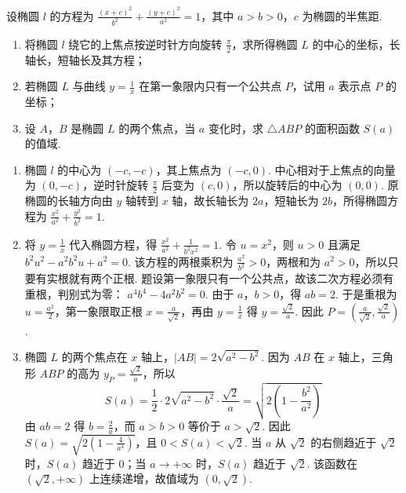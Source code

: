 \documentclass[UTF8,a4paper,oneside,11pt]{ctexbook}
\begin{document}
\begin{problem}
设椭圆 \(l\) 的方程为 \(\frac{(x+c)^{2}}{b^{2}}+\frac{(y+c)^{2}}{a^{2}}=1 \)，其中 \(a>b>0\)，\(c\) 为椭圆的半焦距.

\begin{enumerate}
\item 将椭圆 \(l\) 绕它的上焦点按逆时针方向旋转 \(\frac{\pi}{2} \)，求所得椭圆 \(L\) 的中心的坐标，长轴长，短轴长及其方程；
\item 若椭圆 \(L\) 与曲线 \(y=\frac{1}{x} \) 在第一象限内只有一个公共点 \(P\)，试用 \(a\) 表示点 \(P\) 的坐标；
\item 设 \(A\)，\(B\) 是椭圆 \(L\) 的两个焦点，当 \(a\) 变化时，求 \(\triangle ABP \) 的面积函数 \(S(a) \) 的值域.
\end{enumerate}
\end{problem}

\begin{solution}
\begin{enumerate}
\item 椭圆 \(l\) 的中心为 \((-c,-c)\)，其上焦点为 \((-c,0)\). 中心相对于上焦点的向量为 \((0,-c)\)，逆时针旋转 \(\frac\pi2\) 后变为 \((c,0)\)，所以旋转后的中心为 \((0,0)\). 原椭圆的长轴方向由 \(y\) 轴转到 \(x\) 轴，故长轴长为 \(2a\)，短轴长为 \(2b\)，所得椭圆方程为 \(\frac{x^2}{a^2}+\frac{y^2}{b^2}=1\).

\item 将 \(y=\frac{1}{x}\) 代入椭圆方程，得 \(\frac{x^2}{a^2}+\frac{1}{b^2x^2}=1\). 令 \(u=x^2\)，则 \(u>0\) 且满足
\(b^2u^2-a^2b^2u+a^2=0\). 该方程的两根乘积为 \(\frac{a^2}{b^2}>0\)，两根和为 \(a^2>0\)，所以只要有实根就有两个正根. 题设第一象限只有一个公共点，故该二次方程必须有重根，判别式为零：
\(a^4b^4-4a^2b^2=0\). 由于 \(a\)，\(b>0\)，得 \(ab=2\). 于是重根为 \(u=\frac{a^2}{2}\)，第一象限取正根 \(x=\frac{a}{\sqrt2}\)，再由 \(y=\frac{1}{x}\) 得 \(y=\frac{\sqrt2}{a}\). 因此 \(P=\left(\frac{a}{\sqrt2},\frac{\sqrt2}{a}\right)\).

\item 椭圆 \(L\) 的两个焦点在 \(x\) 轴上，\(|AB|=2\sqrt{a^2-b^2}\). 因为 \(AB\) 在 \(x\) 轴上，三角形 \(ABP\) 的高为 \(y_P=\frac{\sqrt2}{a}\)，所以
\[
S(a)=\frac12\cdot2\sqrt{a^2-b^2}\cdot\frac{\sqrt2}{a}=\sqrt{2\left(1-\frac{b^2}{a^2}\right)}
\]
由 \(ab=2\) 得 \(b=\frac{2}{a}\)，而 \(a>b>0\) 等价于 \(a>\sqrt2\). 因此
\(S(a)=\sqrt{2\left(1-\frac4{a^4}\right)}\)，且 \(0<S(a)<\sqrt2\). 当 \(a\) 从 \(\sqrt2\) 的右侧趋近于 \(\sqrt2\) 时，\(S(a)\) 趋近于 \(0\)；当 \(a\to+\infty\) 时，\(S(a)\) 趋近于 \(\sqrt2\). 该函数在 \((\sqrt2,+\infty)\) 上连续递增，故值域为 \((0,\sqrt2)\).
\end{enumerate}
\end{solution}

\end{document}
